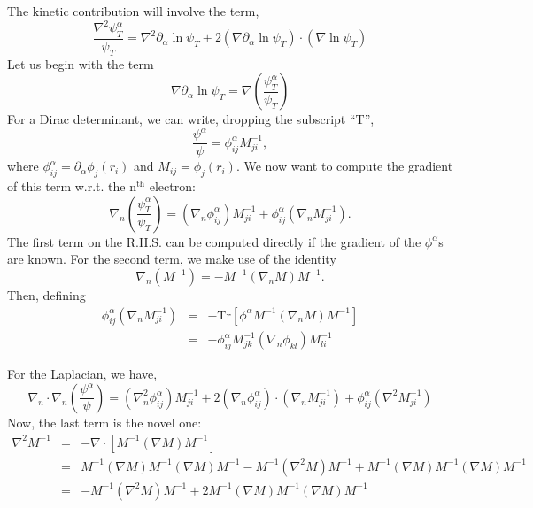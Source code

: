 \documentclass[letterpaper]{article}
\begin{document}
The kinetic contribution will involve the term,
\begin{equation}
\frac{\nabla^2 \psi_T^\alpha}{\psi_T} = \nabla^2 \partial_\alpha \ln
\psi_T + 2 (\nabla \partial_\alpha \ln \psi_T)\cdot (\nabla \ln \psi_T)
\end{equation}
Let us begin with the term
\begin{equation}
\nabla \partial_\alpha \ln \psi_T =
\nabla\left(\frac{\psi^\alpha_T}{\psi_T}\right)
\end{equation}
For a Dirac determinant, we can write, dropping the subscript ``T'', 
\begin{equation}
\frac{\psi^\alpha}{\psi} = \phi^\alpha_{ij} M^{-1}_{ji},
\end{equation}
where $\phi^{\alpha}_{ij} = \partial_\alpha \phi_j(r_i)$ and $M_{ij} =
\phi_j(r_i)$.  We now want to compute the gradient of this term
w.r.t. the n$^\text{th}$ electron:
\begin{equation}
\nabla_n \left(\frac{\psi^\alpha_T}{\psi_T}\right)  = 
(\nabla_n \phi_{ij}^\alpha)M^{-1}_{ji} + \phi^\alpha_{ij} (\nabla_n M^{-1}_{ji}).
\end{equation}
The first term on the R.H.S. can be computed directly if the gradient
of the $\phi^\alpha$s are known.  For the second term, we make use of
the identity 
\begin{equation}
\nabla_n (M^{-1}) = -M^{-1} (\nabla_n M) M^{-1}.
\end{equation}
Then, defining 
\begin{eqnarray}
\phi^\alpha_{ij} (\nabla_n M^{-1}_{ji}) & = & -\text{Tr}\left[\phi^\alpha M^{-1}
  (\nabla_n M)M^{-1}\right] \\
& = & -\phi^\alpha_{ij} M^{-1}_{jk} (\nabla_n \phi_{kl}) M^{-1}_{li}
\end{eqnarray}

For the Laplacian, we have,
\begin{equation}
\nabla_n\cdot\nabla_n\left(\frac{\psi^\alpha}{\psi}\right) =
(\nabla_n^2\phi_{ij}^\alpha)M^{-1}_{ji} +
2(\nabla_n\phi_{ij}^\alpha)\cdot(\nabla_n M^{-1}_{ji}) +
\phi^\alpha_{ij}(\nabla^2 M^{-1}_{ji})
\end{equation} 
Now, the last term is the novel one:
\begin{eqnarray}
\nabla^2 M^{-1} & = & -\nabla\cdot [M^{-1}(\nabla M) M^{-1}] \\
& = & M^{-1}(\nabla M)M^{-1}(\nabla M) M^{-1} - M^{-1}(\nabla^2 M)M^{-1}
+ M^{-1}(\nabla M) M^{-1} (\nabla M) M^{-1} \\
& = & -M^{-1} (\nabla^2 M) M^{-1} + 2 M^{-1}(\nabla M) M^{-1}(\nabla M) M^{-1}
\end{eqnarray}
\end{document}
